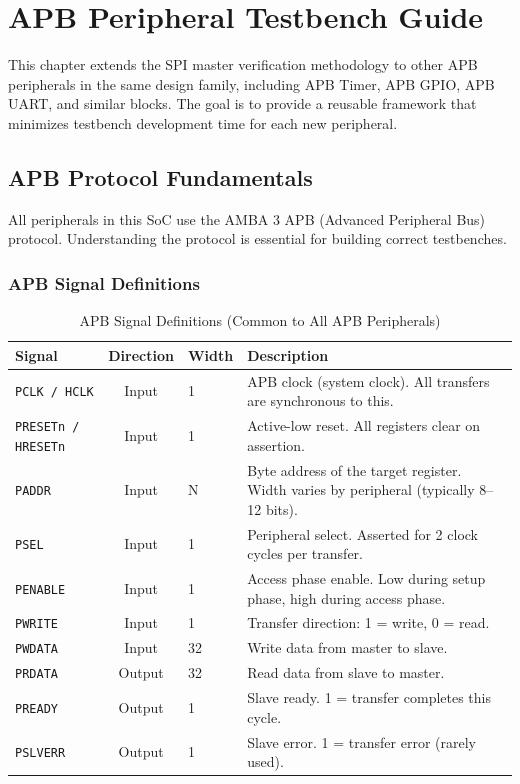 \chapter{APB Peripheral Testbench Guide}
\label{ch:apb_guide}

This chapter extends the SPI master verification methodology to other APB peripherals in the same
design family, including APB Timer, APB GPIO, APB UART, and similar blocks. The goal is to provide
a reusable framework that minimizes testbench development time for each new peripheral.

\section{APB Protocol Fundamentals}

All peripherals in this SoC use the AMBA 3 APB (Advanced Peripheral Bus) protocol. Understanding
the protocol is essential for building correct testbenches.

\subsection{APB Signal Definitions}

\begin{table}[H]
\centering
\caption{APB Signal Definitions (Common to All APB Peripherals)}
\label{tab:apb_signals_def}
\begin{tabularx}{\textwidth}{@{}lclX@{}}
\toprule
\textbf{Signal} & \textbf{Direction} & \textbf{Width} & \textbf{Description} \\
\midrule
\texttt{PCLK / HCLK}  & Input  & 1  & APB clock (system clock). All transfers are synchronous to this. \\
\texttt{PRESETn / HRESETn} & Input & 1 & Active-low reset. All registers clear on assertion. \\
\texttt{PADDR}   & Input  & N  & Byte address of the target register. Width varies by peripheral (typically 8--12 bits). \\
\texttt{PSEL}    & Input  & 1  & Peripheral select. Asserted for 2 clock cycles per transfer. \\
\texttt{PENABLE} & Input  & 1  & Access phase enable. Low during setup phase, high during access phase. \\
\texttt{PWRITE}  & Input  & 1  & Transfer direction: 1 = write, 0 = read. \\
\texttt{PWDATA}  & Input  & 32 & Write data from master to slave. \\
\texttt{PRDATA}  & Output & 32 & Read data from slave to master. \\
\texttt{PREADY}  & Output & 1  & Slave ready. 1 = transfer completes this cycle. \\
\texttt{PSLVERR} & Output & 1  & Slave error. 1 = transfer error (rarely used). \\
\bottomrule
\end{tabularx}
\end{table}

